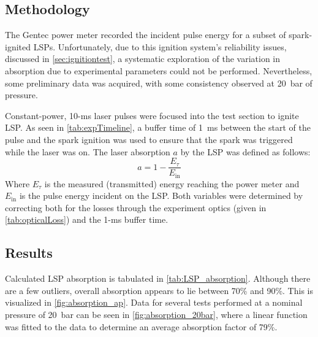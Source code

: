         \subsection{Methodology}
            The Gentec power meter recorded the incident pulse energy for a subset of spark-ignited LSPs. Unfortunately, due to this ignition system's reliability issues, discussed in \autoref{sec:ignitiontest}, a systematic exploration of the variation in absorption due to experimental parameters could not be performed. Nevertheless, some preliminary data was acquired, with some consistency observed at \qty{20}{bar} of pressure.

            Constant-power, \num{10}-\unit{ms} laser pulses were focused into the test section to ignite LSP. As seen in \autoref{tab:expTimeline}, a buffer time of \qty{1}{ms} between the start of the pulse and the spark ignition was used to ensure that the spark was triggered while the laser was on. The laser absorption $a$ by the LSP was defined as follows:
            \begin{equation}
                a = 1-\frac{E_\tau}{E_\mathrm{in}}
            \end{equation}
            Where $E_\tau$ is the measured (transmitted) energy reaching the power meter and $E_\mathrm{in}$ is the pulse energy incident on the LSP. Both variables were determined by correcting both for the losses through the experiment optics (given in \autoref{tab:opticalLoss}) and the \num{1}-\unit{ms} buffer time. 

        \subsection{Results}
            Calculated LSP absorption is tabulated in \autoref{tab:LSP_absorption}. Although there are a few outliers, overall absorption appears to lie between 70\% and 90\%. This is visualized in \autoref{fig:absorption_ap}. Data for several tests performed at a nominal pressure of \qty{20}{bar} can be seen in \autoref{fig:absorption_20bar}, where a linear function was fitted to the data to determine an average absorption factor of 79\%.

            
            
